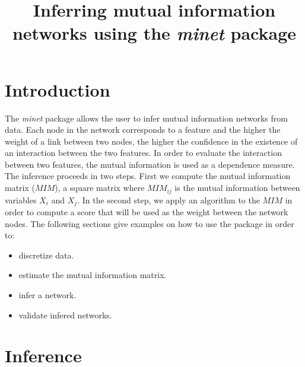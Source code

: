 \documentclass{article}
\newcommand{\Rpackage}[1]{{\textit{#1}}}
\begin{document}
\title{Inferring mutual information networks using the \Rpackage{minet} package}


\maketitle

\section{Introduction}

The \Rpackage{minet} package allows the user to infer mutual information 
networks from data. Each node in the network corresponds to a feature and 
the higher the weight of a link between two nodes, the higher the confidence in 
the existence of an interaction between the two features. 
In order to evaluate the interaction between two features, the mutual information 
is used as a dependence measure. The inference proceeds in two steps. 
First we compute the mutual information matrix ($MIM$), 
a square matrix where $MIM_{ij}$ is the mutual information between variables 
$X_i$ and $X_j$. In the second step, we apply an algorithm to the $MIM$ in order
to compute a score that will be used as the weight between the network nodes.
The following sections give examples on how to use the package in order to:
\begin{itemize}
      \item discretize data.
      \item estimate the mutual information matrix.
      \item infer a network.
      \item validate infered networks.
\end{itemize}

\section{Inference}
\end{document}
